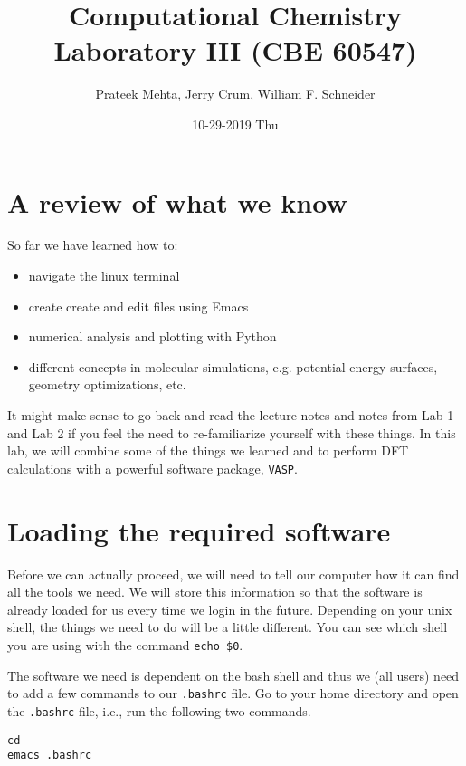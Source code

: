 \documentclass[11pt]{article}
\author{Prateek Mehta, Jerry Crum,  William F. Schneider}
\date{10-29-2019 Thu}
\title{Computational Chemistry Laboratory III (CBE 60547)}
\begin{document}
\maketitle


\section{A review of what we know}
\label{sec:org543d93d}

So far we have learned how to:

\begin{itemize}
\item navigate the linux terminal

\item create create and edit files using Emacs

\item numerical analysis and plotting with Python

\item different concepts in molecular simulations, e.g. potential energy surfaces, geometry optimizations, etc.
\end{itemize}

It might make sense to go back and read the lecture notes and notes from Lab 1 and Lab 2 if you feel the need to re-familiarize yourself with these things. In this lab, we will combine some of the things we learned and to perform DFT calculations with a powerful software package, \texttt{VASP}. 


\section{Loading the required software}
\label{sec:org130eb0d}

Before we can actually proceed, we will need to tell our computer how it can find all the tools we need. We will store this information so that the software is already loaded for us every time we login in the future. Depending on your unix shell, the things we need to do will be a little different. You can see which shell you are using with the command \texttt{echo \$0}. 

The software we need is dependent on the bash shell and thus we (all users) need to add a few commands to our \texttt{.bashrc} file. Go to your home directory and open the \texttt{.bashrc} file, i.e., run the following two commands. 

\begin{verbatim}
cd
emacs .bashrc
\end{verbatim}
\end{document}
